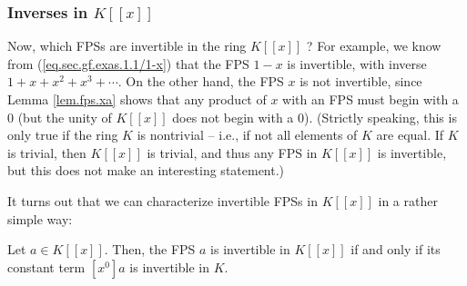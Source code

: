 \subsubsection{Inverses in $K\left[  \left[  x\right]  \right]  $}

Now, which FPSs are invertible in the ring $K\left[  \left[  x\right]
\right]  $ ? For example, we know from (\ref{eq.sec.gf.exas.1.1/1-x}) that the
FPS $1-x$ is invertible, with inverse $1+x+x^{2}+x^{3}+\cdots$. On the other
hand, the FPS $x$ is not invertible, since Lemma \ref{lem.fps.xa} shows that
any product of $x$ with an FPS must begin with a $0$ (but the unity of
$K\left[  \left[  x\right]  \right]  $ does not begin with a $0$). (Strictly
speaking, this is only true if the ring $K$ is nontrivial -- i.e., if not all
elements of $K$ are equal. If $K$ is trivial, then $K\left[  \left[  x\right]
\right]  $ is trivial, and thus any FPS in $K\left[  \left[  x\right]
\right]  $ is invertible, but this does not make an interesting statement.)

It turns out that we can characterize invertible FPSs in $K\left[  \left[
x\right]  \right]  $ in a rather simple way:

\begin{proposition}
\label{prop.fps.invertible}Let $a\in K\left[  \left[  x\right]  \right]  $.
Then, the FPS $a$ is invertible in $K\left[  \left[  x\right]  \right]  $ if
and only if its constant term $\left[  x^{0}\right]  a$ is invertible in $K$.
\end{proposition}

